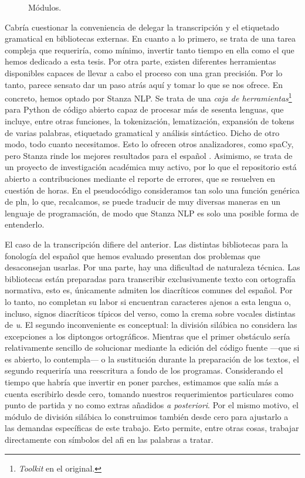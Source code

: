 \begin{figure}[!ht]
	\centering
		
	\caption{Módulos.}
	\label{fig:modulos}
\end{figure}

Cabría cuestionar la conveniencia de delegar la transcripción y el etiquetado gramatical en bibliotecas externas. En cuanto a lo primero, se trata de una tarea compleja que requeriría, como mínimo, invertir tanto tiempo en ella como el que hemos dedicado a esta tesis. Por otra parte, existen diferentes herramientas disponibles capaces de llevar a cabo el proceso con una gran precisión. Por lo tanto, parece sensato dar un paso atrás aquí y tomar lo que se nos ofrece. En concreto, hemos optado por Stanza NLP. Se trata de una \textit{caja de herramientas}\footnote{\textit{Toolkit} en el original.} para Python de código abierto capaz de procesar más de sesenta lenguas, que incluye, entre otras funciones, la tokenización, lematización, expansión de tokens de varias palabras, etiquetado gramatical y análisis sintáctico. Dicho de otro modo, todo cuanto necesitamos. Esto lo ofrecen otros analizadores, como spaCy, pero Stanza rinde los mejores resultados para el español \parencite{qi2020}. Asimismo, se trata de un proyecto de investigación académica muy activo, por lo que el repositorio está abierto a contribuciones mediante el reporte de errores, que se resuelven en cuestión de horas. En el pseudocódigo consideramos tan solo una función genérica de \ac{pln}, lo que, recalcamos, se puede traducir de muy diversas maneras  en un lenguaje de programación, de modo que Stanza NLP es solo una posible forma de entenderlo.

El caso de la transcripción difiere del anterior. Las distintas bibliotecas para la fonología del español que hemos evaluado presentan dos problemas que desaconsejan usarlas. Por una parte, hay una dificultad de naturaleza técnica. Las bibliotecas están preparadas para transcribir exclusivamente texto con ortografía normativa, esto es, únicamente admiten los diacríticos comunes del español. Por lo tanto, no completan su labor si encuentran caracteres ajenos a esta lengua o, incluso, signos diacríticos típicos del verso, como la crema sobre vocales distintas de \textit{u}. El segundo inconveniente es conceptual: la división silábica no considera las excepciones a los diptongos ortográficos. Mientras que el primer obstáculo sería relativamente sencillo de solucionar mediante la edición del código fuente —que si es abierto, lo contempla— o la sustitución durante la preparación de los textos, el segundo requeriría una reescritura a fondo de los programas. Considerando el tiempo que habría que invertir en poner parches, estimamos que salía más a cuenta escribirlo desde cero, tomando nuestros requerimientos particulares como punto de partida y no como extras añadidos \textit{a posteriori}. Por el mismo motivo, el módulo de división silábica lo construimos también desde cero para ajustarlo a las demandas específicas de este trabajo. Esto permite, entre otras cosas, trabajar directamente con símbolos del \ac{afi} en las palabras a tratar.

